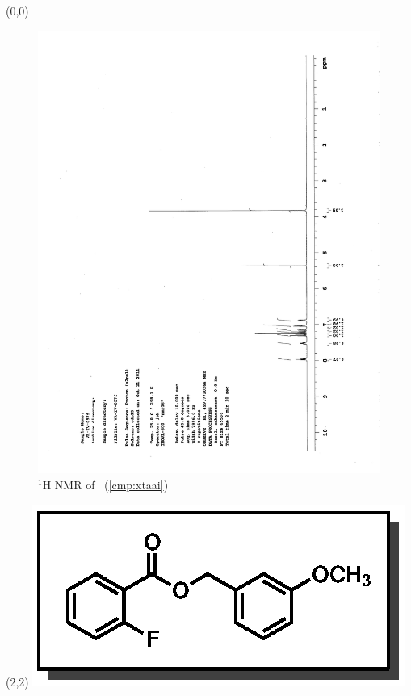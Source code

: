 \begin{textblock}{20}(0,0)
\begin{figure}[htb]
\caption{$^1$H NMR of \CMPxtaai\ (\ref{cmp:xtaai})}
\includegraphics[scale=0.75, trim = 0mm 0mm 0mm 5mm,
clip]{chp_asymmetric/images/nmr/xtaaiH}
\vspace{-100pt}
\end{figure}
\end{textblock}
\begin{textblock}{1}(2,2)
\includegraphics[scale=0.8, angle=90]{chp_asymmetric/images/xtaai}
\end{textblock}
